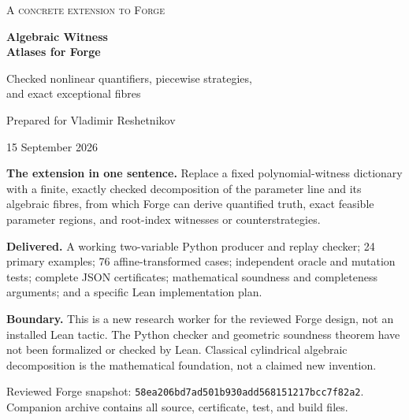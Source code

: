 \documentclass[11pt,a4paper]{article}
\theoremstyle{definition}\newtheorem{definition}[theorem]{Definition}
\theoremstyle{remark}\newtheorem{remark}[theorem]{Remark}
\begin{document}
\hypersetup{pageanchor=false}
\begin{titlepage}
\vspace*{16mm}
{\Large\color{muted}\textsc{A concrete extension to Forge}}\par
\vspace{12mm}
{\Huge\bfseries\color{ink}Algebraic Witness\\[3mm]Atlases for Forge}\par
\vspace{8mm}
{\LARGE Checked nonlinear quantifiers, piecewise strategies,\\[2mm]and exact exceptional fibres}\par
\vspace{12mm}
{\large Prepared for Vladimir Reshetnikov}\par
{\large 15 September 2026}\par
\vfill
\begin{minipage}{0.93\textwidth}
\textbf{The extension in one sentence.} Replace a fixed polynomial-witness dictionary with a finite, exactly checked decomposition of the parameter line and its algebraic fibres, from which Forge can derive quantified truth, exact feasible parameter regions, and root-index witnesses or counterstrategies.

\textbf{Delivered.} A working two-variable Python producer and replay checker; 24 primary examples; 76 affine-transformed cases; independent oracle and mutation tests; complete JSON certificates; mathematical soundness and completeness arguments; and a specific Lean implementation plan.

\textbf{Boundary.} This is a new research worker for the reviewed Forge design, not an installed Lean tactic. The Python checker and geometric soundness theorem have not been formalized or checked by Lean. Classical cylindrical algebraic decomposition is the mathematical foundation, not a claimed new invention.
\end{minipage}
\vfill
{\small Reviewed Forge snapshot: \texttt{58ea206bd7ad501b930add568151217bcc7f82a2}.\\
Companion archive contains all source, certificate, test, and build files.}
\end{titlepage}
\hypersetup{pageanchor=true}
\end{document}
